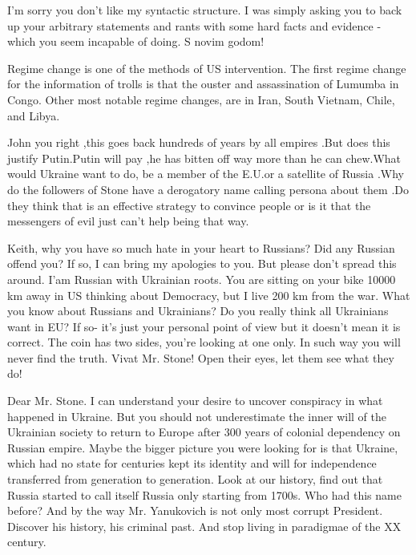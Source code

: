 \begin{itemize}
\begin{itemize}

I’m sorry you don't like my syntactic structure. I was simply asking you to
back up your arbitrary statements and rants with some hard facts and evidence -
which you seem incapable of doing. S novim godom!


Regime change is one of the methods of US intervention. The first regime change
for the information of trolls is that the ouster and assassination of Lumumba
in Congo. Other most notable regime changes, are in Iran, South Vietnam, Chile,
and Libya.


John you right ,this goes back hundreds of years by all empires .But does this
justify Putin.Putin will pay ,he has bitten off way more than he can chew.What
would Ukraine want to do, be a member of the E.U.or a satellite of Russia .Why
do the followers of Stone have a derogatory name calling persona about them .Do
they think that is an effective strategy to convince people or is it that the
messengers of evil just can't help being that way.


Keith, why you have so much hate in your heart to Russians? Did any Russian
offend you? If so, I can bring my apologies to you. But please don't spread
this around. I'am Russian with Ukrainian roots. You are sitting on your bike
10000 km away in US thinking about Democracy, but I live 200 km from the war.
What you know about Russians and Ukrainians? Do you really think all Ukrainians
want in EU? If so- it's just your personal point of view but it doesn't mean it
is correct. The coin has two sides, you're looking at one only. In such way you
will never find the truth. Vivat Mr. Stone! Open their eyes, let them see what
they do!

\end{itemize} %


Dear Mr. Stone. I can understand your desire to uncover conspiracy in what
happened in Ukraine. But you should not underestimate the inner will of the
Ukrainian society to return to Europe after 300 years of colonial dependency on
Russian empire. Maybe the bigger picture you were looking for is that Ukraine,
which had no state for centuries kept its identity and will for independence
transferred from generation to generation. Look at our history, find out that
Russia started to call itself Russia only starting from 1700s. Who had this
name before? And by the way Mr. Yanukovich is not only most corrupt President.
Discover his history, his criminal past. And stop living in paradigmae of the
XX century.


\end{itemize}
